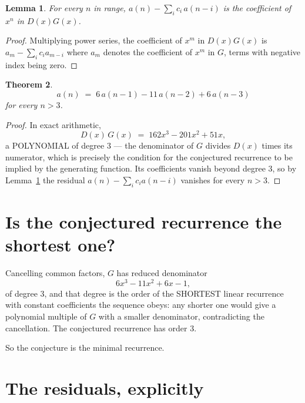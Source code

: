 \documentclass[11pt,a4paper]{article}
\theoremstyle{plain}
\newtheorem{theorem}{Theorem}
\newtheorem{lemma}[theorem]{Lemma}
\theoremstyle{definition}
\begin{document}
\begin{lemma}\label{lem:key}
For every $n$ in range, $a(n)-\sum_i c_i\,a(n-i)$ is the coefficient of $x^{n}$ in
$D(x)G(x)$.
\end{lemma}

\begin{proof}
Multiplying power series, the coefficient of $x^{m}$ in $D(x)G(x)$ is
$a_m-\sum_i c_i a_{m-i}$ where $a_m$ denotes the coefficient of $x^{m}$ in $G$, terms with
negative index being zero.
\end{proof}

\begin{theorem}
\[
a(n)\;=\;6\,a(n-1) - 11\,a(n-2) + 6\,a(n-3)
\]
for every $n>3$.
\end{theorem}

\begin{proof}
In exact arithmetic,
\[
D(x)\,G(x)\;=\;162 x^{3} - 201 x^{2} + 51 x,
\]
a POLYNOMIAL of degree $3$ --- the denominator of $G$ divides $D(x)$ times its numerator,
which is precisely the condition for the conjectured recurrence to be implied by the
generating function. Its coefficients vanish beyond degree $3$, so by
Lemma~\ref{lem:key} the residual $a(n)-\sum_ic_ia(n-i)$ vanishes for every
$n>3$.
\end{proof}

\section{Is the conjectured recurrence the shortest one?}

Cancelling common factors, $G$ has reduced denominator
\[
6 x^{3} - 11 x^{2} + 6 x - 1,
\]
of degree $3$, and that degree is the order of the SHORTEST linear recurrence with
constant coefficients the sequence obeys: any shorter one would give a polynomial multiple of
$G$ with a smaller denominator, contradicting the cancellation. The conjectured recurrence has
order $3$.

So the conjecture is the minimal recurrence.

\section{The residuals, explicitly}
\end{document}
